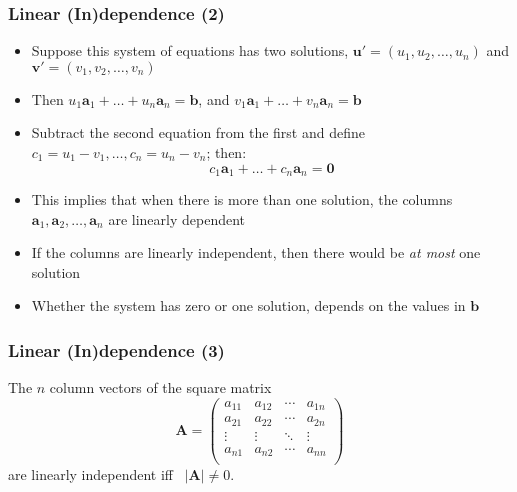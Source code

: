 \documentclass[10pt]{beamer}
\theoremstyle{definition}
\begin{document}
\begin{frame}[fragile]
\frametitle{Linear (In)dependence (2)}
\begin{itemize}
	\item Suppose this system of equations has two solutions, $\mathbf{u}' = (u_{1}, u_{2},\ldots, u_{n})$ and $\mathbf{v}' = (v_{1}, v_{2},\ldots, v_{n})$
	\item Then $u_{1}\mathbf{a}_{1} + \ldots + u_{n}\mathbf{a}_{n} = \mathbf{b}$, and $v_{1}\mathbf{a}_{1} + \ldots + v_{n}\mathbf{a}_{n} = \mathbf{b}$
	\item Subtract the second equation from the first and define $c_{1} = u_{1} - v_{1}, \ldots, c_{n} = u_{n} - v_{n}$; then:
	\[
		c_{1}\mathbf{a}_{1} + \ldots + c_{n}\mathbf{a}_{n} = \mathbf{0}
	\]
	\item This implies that when there is more than one solution, the columns $\mathbf{a}_{1}, \mathbf{a}_{2}, \ldots, \mathbf{a}_{n}$ are linearly dependent
	\item If the columns are linearly independent, then there would be \textit{at most} one solution
	\item Whether the system has zero or one solution, depends on the values in $\mathbf{b}$
\end{itemize}
\end{frame}

\begin{frame}[fragile]
\frametitle{Linear (In)dependence (3)}
\begin{theorem}
	The $n$ column vectors of the square matrix 
	\[
		\mathbf{A} = 
		\begin{pmatrix}
			a_{11} & a_{12} & \cdots & a_{1n}\\
			a_{21} & a_{22} & \cdots & a_{2n}\\
			\vdots & \vdots & \ddots & \vdots\\
			a_{n1} & a_{n2} & \cdots & a_{nn}\\
		\end{pmatrix}
	\]
	are linearly independent iff \, $|\mathbf{A}| \neq 0$.
\end{theorem}
\end{frame}
\end{document}
